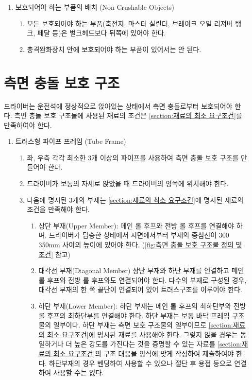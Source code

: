 \documentclass[final,a4paper,10pt]{report}
\begin{document}
\begin{enumerate}
\begin{enumerate}
    \end{enumerate}
    
  \item 보호되어야 하는 부품의 배치 (Non-Crushable Objects)
    \begin{enumerate}
      \item 모든 보호되어야 하는 부품(축전지, 마스터 실린더, 브레이크 오일 리져버 탱크, 페달 등)은 벌크헤드보다 뒤쪽에 있어야 한다.
      \item 충격완화장치 안에 보호되어야 하는 부품이 있어서는 안 된다. 
    \end{enumerate}
\end{enumerate}

\section{측면 충돌 보호 구조} \label{section:측면 충돌 보호 구조}
드라이버는 운전석에 정상적으로 앉아있는 상태에서 측면 충돌로부터 보호되어야 한다. 측면 충돌 보호 구조물에 사용된 재료의 조건은 \cref{section:재료의 최소 요구조건}를 만족하여야 한다.
\begin{enumerate}
  \item 트러스형 파이프 프레임 (Tube Frame)
    \begin{enumerate}
      \item 좌, 우측 각각 최소한 3개 이상의 파이프를 사용하여 측면 충돌 보호 구조를 만들어야 한다.
      \item 드라이버가 보통의 자세로 앉았을 때 드라이버의 양쪽에 위치해야 한다.
      
      \item 다음에 명시된 3개의 부재는 \cref{section:재료의 최소 요구조건}에 명시된 재료의 조건을 만족해야 한다.
        \begin{enumerate}
          \item 상단 부재(Upper Member): 메인 롤 후프와 전방 롤 후프를 연결해야 하며, 드라이버가 탑승한 상태에서 지면에서부터 부재의 중심선이 300 \string~ 350mm 사이의 높이에 있어야 한다. (\cref{fig:측면 충돌 보호 구조물 정의 및 조건} 참고)
          \item 대각선 부재(Diagonal Member)  상단 부재와 하단 부재를 연결하고 메인 롤 후프와 전방 롤 후프와도 연결되어야 한다. 다수의 부재로 구성된 경우, 대각선 부재의 한 쪽 끝단이 연결되어 있어 트러스구조를 이루어야 한다.
          \item 하단 부재(Lower Member): 하단 부재는 메인 롤 후프의 최하단부와 전방 롤 후프의 최하단부를 연결해야 한다. 하단 부재는 보통 바닥 프레임 구조물의 일부이다. 하단 부재는 측면 보호 구조물의 일부이므로 \cref{section:재료의 최소 요구조건}에 명시된 재료를 사용해야 한다. 그렇지 않을 경우는 동일하거나 더 높은 강도를 가진다는 것을 증명할 수 있는 자료를 \cref{section:재료의 최소 요구조건}의 구조 대응물 양식에 맞게 작성하여 제출하여야 한다. 하단부재의 경우 벤딩하여 사용할 수 있으나 절단 후 용접 등으로 연결하여 사용할 수는 없다.
          
        \end{enumerate}
    \end{enumerate}
\end{enumerate}
\end{document}

